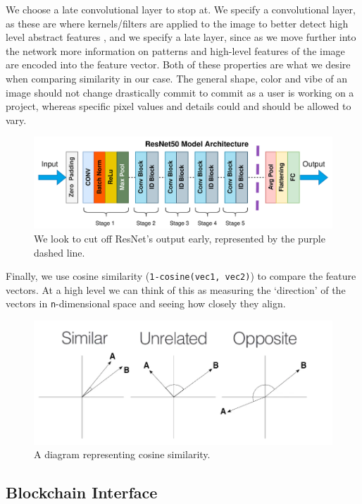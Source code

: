 \documentclass[12pt,a4paper]{article}
\begin{document}
We choose a late convolutional layer to stop at. We specify a convolutional layer, as these are where kernels/filters are applied to the image to better detect high level abstract features \cite{convNN}, and we specify a late layer, since as we move further into the network more information on patterns and high-level features of the image are encoded into the feature vector. Both of these properties are what we desire when comparing similarity in our case. The general shape, color and vibe of an image should not change drastically commit to commit as a user is working on a project, whereas specific pixel values and details could and should be allowed to vary.
\begin{figure}[H]
    \centering
    \includegraphics[scale=0.8]{resnet.png}
    \caption{We look to cut off ResNet's output early, represented by the purple dashed line.}
\end{figure}
Finally, we use cosine similarity (\verb|1-cosine(vec1, vec2)|) to compare the feature vectors. At a high level we can think of this as measuring the `direction' of the vectors in \verb|n|-dimensional space and seeing how closely they align.
\begin{figure}[H]
    \centering
    \includegraphics[scale=0.5]{cosine.png}
    \caption{A diagram representing cosine similarity.}
\end{figure}

\subsection{Blockchain Interface}
\end{document}

